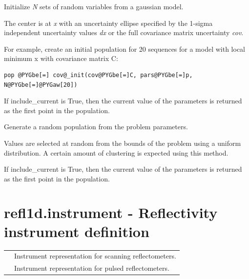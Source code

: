 \documentclass[letterpaper,10pt,english]{sphinxmanual}
\begin{document}
\begin{fulllineitems}
\label{api/initpop:refl1d.initpop.cov_init}
Initialize \emph{N} sets of random variables from a gaussian model.

The center is at \emph{x} with an uncertainty ellipse specified by the
1-sigma independent uncertainty values \emph{dx} or the full covariance
matrix uncertainty \emph{cov}.

For example, create an initial population for 20 sequences for a
model with local minimum x with covariance matrix C:

\begin{Verbatim}[commandchars=@\[\]]
pop @PYGbe[=] cov@_init(cov@PYGbe[=]C, pars@PYGbe[=]p, N@PYGbe[=]@PYGaw[20])
\end{Verbatim}

If include\_current is True, then the current value of the parameters
is returned as the first point in the population.

\end{fulllineitems}


\begin{fulllineitems}
\label{api/initpop:refl1d.initpop.random_init}
Generate a random population from the problem parameters.

Values are selected at random from the bounds of the problem using a
uniform distribution.  A certain amount of clustering is expected
using this method.

If include\_current is True, then the current value of the parameters
is returned as the first point in the population.

\end{fulllineitems}



\section{refl1d.instrument - Reflectivity instrument definition}
\label{api/instrument::doc}\label{api/instrument:refl1d-instrument-reflectivity-instrument-definition}
\begin{tabulary}{\linewidth}{LL}
\hline

{\hyperref[api/instrument:refl1d.instrument.Monochromatic]{}}
 & 
Instrument representation for scanning reflectometers.
\\

{\hyperref[api/instrument:refl1d.instrument.Pulsed]{}}
 & 
Instrument representation for pulsed reflectometers.
\\
\hline
\end{tabulary}
\end{document}
